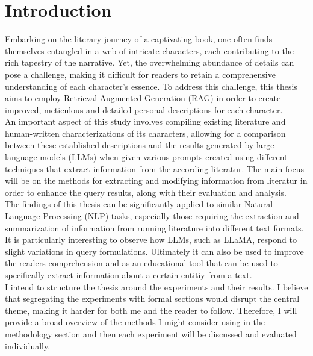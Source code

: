 \chapter{Introduction}

Embarking on the literary journey of a captivating book, one often finds themselves entangled in a web of intricate characters, each contributing to the rich tapestry of the narrative. Yet, the overwhelming abundance of details can pose a challenge, making it difficult for readers to retain a comprehensive understanding of each character's essence. To address this challenge, this thesis aims to employ Retrieval-Augmented Generation (RAG) in order to create improved, meticulous and detailed personal descriptions for each character.\\

An important aspect of this study involves compiling existing literature and human-written characterizations of its characters, allowing for a comparison between these established descriptions and the results generated by large language models (LLMs) when given various prompts created using different techniques that extract information from the according literatur. The main focus will be on the methods for extracting and modifying information from literatur in order to enhance the query results, along with their evaluation and analysis.\\

The findings of this thesis can be significantly applied to similar Natural Language Processing (NLP) tasks, especially those requiring the extraction and summarization of information from running literature into different text formats. It is particularly interesting to observe how LLMs, such as LLaMA, respond to slight variations in query formulations. 
Ultimately it can also be used to improve the readers comprehension and as an educational tool that can be used to specifically extract information about a certain entitiy from a text.\\


I intend to structure the thesis around the experiments and their results. I believe that segregating the experiments with formal sections would disrupt the central theme, making it harder for both me and the reader to follow. Therefore, I will provide a broad overview of the methods I might consider using in the methodology section and then each experiment will be discussed and evaluated individually.
